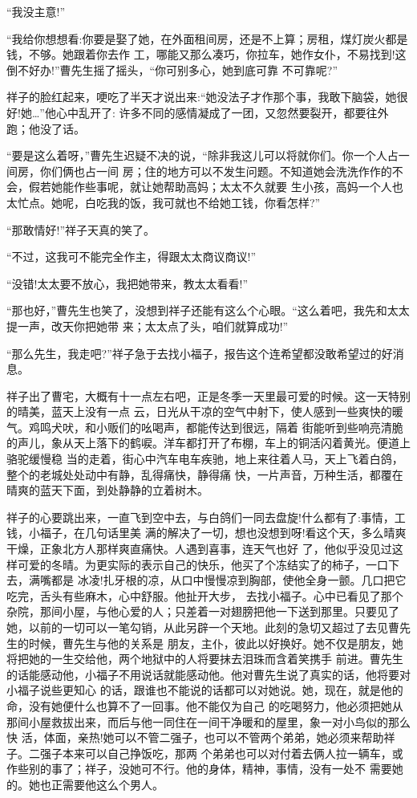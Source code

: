 \documentclass[11pt,a4paper,onecolumn]{article}
\begin{document}
``我没主意!''

``我给你想想看:你要是娶了她，在外面租间房，还是不上算；房租，煤灯炭火都是钱，不够。她跟着你去作
工，哪能又那么凑巧，你拉车，她作女仆，不易找到!这倒不好办!''曹先生摇了摇头，``你可别多心，她到底可靠
不可靠呢?''

祥子的脸红起来，哽吃了半天才说出来:``她没法子才作那个事，我敢下脑袋，她很好!她\ldots ''他心中乱开了:
许多不同的感情凝成了一团，又忽然要裂开，都要往外跑；他没了话。

``要是这么着呀，''曹先生迟疑不决的说，``除非我这儿可以将就你们。你一个人占一间房，你们俩也占一间
房；住的地方可以不发生问题。不知道她会洗洗作作的不会，假若她能作些事呢，就让她帮助高妈；太太不久就要
生小孩，高妈一个人也太忙点。她呢，白吃我的饭，我可就也不给她工钱，你看怎样?''

``那敢情好!''祥子天真的笑了。

``不过，这我可不能完全作主，得跟太太商议商议!''

``没错!太太要不放心，我把她带来，教太太看看!''

``那也好，''曹先生也笑了，没想到祥子还能有这么个心眼。``这么着吧，我先和太太提一声，改天你把她带
来；太太点了头，咱们就算成功!''

``那么先生，我走吧?''祥子急于去找小福子，报告这个连希望都没敢希望过的好消息。

祥子出了曹宅，大概有十一点左右吧，正是冬季一天里最可爱的时候。这一天特别的晴美，蓝天上没有一点
云，日光从干凉的空气中射下，使人感到一些爽快的暖气。鸡鸣犬吠，和小贩们的吆喝声，都能传达到很远，隔着
街能听到些响亮清脆的声儿，象从天上落下的鹤唳。洋车都打开了布棚，车上的铜活闪着黄光。便道上骆驼缓慢稳
当的走着，街心中汽车电车疾驰，地上来往着人马，天上飞着白鸽，整个的老城处处动中有静，乱得痛快，静得痛
快，一片声音，万种生活，都覆在晴爽的蓝天下面，到处静静的立着树木。

祥子的心要跳出来，一直飞到空中去，与白鸽们一同去盘旋!什么都有了:事情，工钱，小福子，在几句话里美
满的解决了一切，想也没想到呀!看这个天，多么晴爽干燥，正象北方人那样爽直痛快。人遇到喜事，连天气也好
了，他似乎没见过这样可爱的冬晴。为更实际的表示自己的快乐，他买了个冻结实了的柿子，一口下去，满嘴都是
冰凌!扎牙根的凉，从口中慢慢凉到胸部，使他全身一颤。几口把它吃完，舌头有些麻木，心中舒服。他扯开大步，
去找小福子。心中已看见了那个杂院，那间小屋，与他心爱的人；只差着一对翅膀把他一下送到那里。只要见了
她，以前的一切可以一笔勾销，从此另辟一个天地。此刻的急切又超过了去见曹先生的时候，曹先生与他的关系是
朋友，主仆，彼此以好换好。她不仅是朋友，她将把她的一生交给他，两个地狱中的人将要抹去泪珠而含着笑携手
前进。曹先生的话能感动他，小福子不用说话就能感动他。他对曹先生说了真实的话，他将要对小福子说些更知心
的话，跟谁也不能说的话都可以对她说。她，现在，就是他的命，没有她便什么也算不了一回事。他不能仅为自己
的吃喝努力，他必须把她从那间小屋救拔出来，而后与他一同住在一间干净暖和的屋里，象一对小鸟似的那么快
活，体面，亲热!她可以不管二强子，也可以不管两个弟弟，她必须来帮助祥子。二强子本来可以自己挣饭吃，那两
个弟弟也可以对付着去俩人拉一辆车，或作些别的事了；祥子，没她可不行。他的身体，精神，事情，没有一处不
需要她的。她也正需要他这么个男人。
\end{document}
